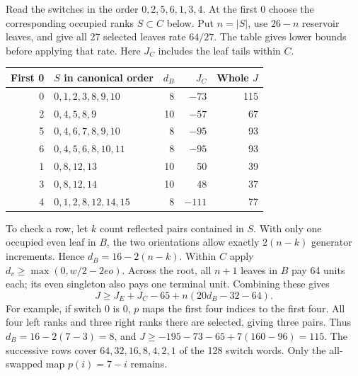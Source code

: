 \documentclass[12pt,letterpaper]{article}
\begin{document}
Read the switches in the order \(0,2,5,6,1,3,4\). At the first 0 choose the corresponding occupied ranks \(S\subset C\) below. Put \(n=|S|\), use \(26-n\) reservoir leaves, and give all 27 selected leaves rate \(64/27\). The table gives lower bounds before applying that rate. Here \(J_C\) includes the leaf tails within \(C\).
\begin{center}\begin{tabular}{@{}r l r r r@{}}\toprule
First 0 & \(S\) in canonical order & \(d_B\) & \(J_C\) & Whole \(J\)\\\midrule
0 & \(0,1,2,3,8,9,10\) & 8 & \(-73\) & 115\\
2 & \(0,4,5,8,9\) & 10 & \(-57\) & 67\\
5 & \(0,4,6,7,8,9,10\) & 8 & \(-95\) & 93\\
6 & \(0,4,5,6,8,10,11\) & 8 & \(-95\) & 93\\
1 & \(0,8,12,13\) & 10 & 50 & 39\\
3 & \(0,8,12,14\) & 10 & 48 & 37\\
4 & \(0,1,2,8,12,14,15\) & 8 & \(-111\) & 77\\\bottomrule
\end{tabular}\end{center}
To check a row, let \(k\) count reflected pairs contained in \(S\). With only one occupied even leaf in \(B\), the two orientations allow exactly \(2(n-k)\) generator increments. Hence \(d_B=16-2(n-k)\). Within \(C\) apply \(d_v\ge\max(0,w/2-2eo)\). Across the root, all \(n+1\) leaves in \(B\) pay 64 units each; its even singleton also pays one terminal unit. Combining these gives
\[
           J\ge J_E+J_C-65+n(20d_B-32-64).
\]
For example, if switch 0 is 0, \(p\) maps the first four indices to the first four. All four left ranks and three right ranks there are selected, giving three pairs. Thus \(d_B=16-2(7-3)=8\), and \(J\ge-195-73-65+7(160-96)=115\). The successive rows cover \(64,32,16,8,4,2,1\) of the 128 switch words. Only the all-swapped map \(p(i)=7-i\) remains.
\end{document}
